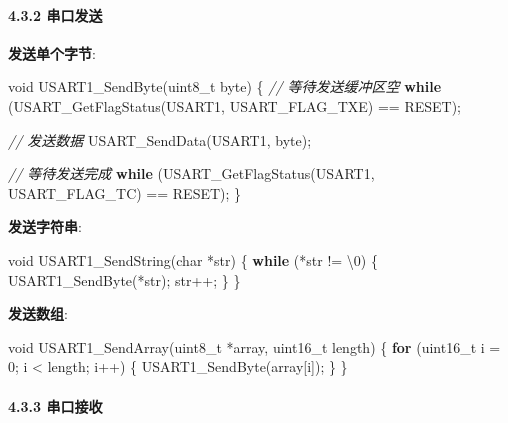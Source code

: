 \documentclass[
]{article}
\newenvironment{Shaded}{}{}
\newcommand{\CharTok}[1]{\textcolor[rgb]{0.25,0.44,0.63}{#1}}
\newcommand{\CommentTok}[1]{\textcolor[rgb]{0.38,0.63,0.69}{\textit{#1}}}
\newcommand{\ControlFlowTok}[1]{\textcolor[rgb]{0.00,0.44,0.13}{\textbf{#1}}}
\newcommand{\DataTypeTok}[1]{\textcolor[rgb]{0.56,0.13,0.00}{#1}}
\newcommand{\DecValTok}[1]{\textcolor[rgb]{0.25,0.63,0.44}{#1}}
\newcommand{\NormalTok}[1]{#1}
\begin{document}
\hypertarget{ux4e32ux53e3ux53d1ux9001}{%
\paragraph{4.3.2 串口发送}\label{ux4e32ux53e3ux53d1ux9001}}

\textbf{发送单个字节}:

\begin{Shaded}
\begin{Highlighting}[]
\DataTypeTok{void}\NormalTok{ USART1\_SendByte(}\DataTypeTok{uint8\_t}\NormalTok{ byte)}
\NormalTok{\{}
    \CommentTok{// 等待发送缓冲区空}
    \ControlFlowTok{while}\NormalTok{ (USART\_GetFlagStatus(USART1, USART\_FLAG\_TXE) == RESET);}
    
    \CommentTok{// 发送数据}
\NormalTok{    USART\_SendData(USART1, byte);}
    
    \CommentTok{// 等待发送完成}
    \ControlFlowTok{while}\NormalTok{ (USART\_GetFlagStatus(USART1, USART\_FLAG\_TC) == RESET);}
\NormalTok{\}}
\end{Highlighting}
\end{Shaded}

\textbf{发送字符串}:

\begin{Shaded}
\begin{Highlighting}[]
\DataTypeTok{void}\NormalTok{ USART1\_SendString(}\DataTypeTok{char}\NormalTok{ *str)}
\NormalTok{\{}
    \ControlFlowTok{while}\NormalTok{ (*str != }\CharTok{\textquotesingle{}\textbackslash{}0\textquotesingle{}}\NormalTok{) \{}
\NormalTok{        USART1\_SendByte(*str);}
\NormalTok{        str++;}
\NormalTok{    \}}
\NormalTok{\}}
\end{Highlighting}
\end{Shaded}

\textbf{发送数组}:

\begin{Shaded}
\begin{Highlighting}[]
\DataTypeTok{void}\NormalTok{ USART1\_SendArray(}\DataTypeTok{uint8\_t}\NormalTok{ *array, }\DataTypeTok{uint16\_t}\NormalTok{ length)}
\NormalTok{\{}
    \ControlFlowTok{for}\NormalTok{ (}\DataTypeTok{uint16\_t}\NormalTok{ i = }\DecValTok{0}\NormalTok{; i \textless{} length; i++) \{}
\NormalTok{        USART1\_SendByte(array[i]);}
\NormalTok{    \}}
\NormalTok{\}}
\end{Highlighting}
\end{Shaded}

\hypertarget{ux4e32ux53e3ux63a5ux6536}{%
\paragraph{4.3.3 串口接收}\label{ux4e32ux53e3ux63a5ux6536}}
\end{document}
